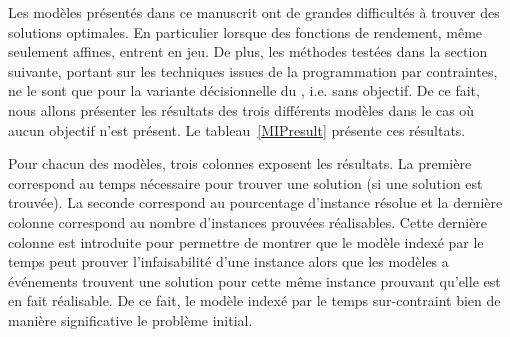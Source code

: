 Les modèles présentés dans ce manuscrit ont de grandes difficultés à
trouver des solutions optimales. En particulier lorsque des fonctions
de rendement, même seulement affines, entrent en jeu. De plus, les
méthodes testées dans la section suivante, portant sur les techniques
issues de la programmation par contraintes, ne le sont que pour la
variante décisionnelle du \CECSP, i.e. sans objectif. De ce fait, nous
allons présenter les résultats des trois différents modèles dans le
cas où aucun objectif n'est présent. Le tableau~\ref{MIPresult}
présente ces résultats. 

Pour chacun des modèles, trois colonnes exposent les résultats. La
première correspond au temps nécessaire pour trouver une solution (si
une solution est trouvée). La seconde correspond au pourcentage
d'instance résolue et la dernière colonne correspond au nombre
d'instances prouvées réalisables. Cette dernière colonne est introduite
pour permettre de montrer que le modèle indexé par le temps peut
prouver l'infaisabilité d'une instance alors que les modèles a
événements trouvent une solution pour cette même instance prouvant
qu'elle est en fait réalisable. De ce fait, le modèle indexé par le
temps sur-contraint bien de manière significative le problème initial.


